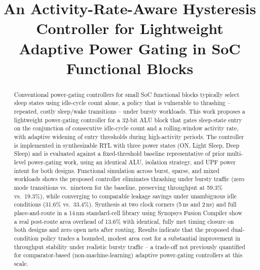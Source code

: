\documentclass[journal]{IEEEtran}
\begin{document}
\title{An Activity-Rate-Aware Hysteresis Controller for Lightweight Adaptive Power Gating in SoC Functional Blocks}

\author{
}

\maketitle


\begin{abstract}
Conventional power-gating controllers for small SoC functional blocks typically select sleep states using idle-cycle count alone, a policy that is vulnerable to thrashing -- repeated, costly sleep/wake transitions -- under bursty workloads. This work proposes a lightweight power-gating controller for a 32-bit ALU block that gates sleep-state entry on the conjunction of consecutive idle-cycle count and a rolling-window activity rate, with adaptive widening of entry thresholds during high-activity periods. The controller is implemented in synthesizable RTL with three power states (ON, Light Sleep, Deep Sleep) and is evaluated against a fixed-threshold baseline representative of prior multi-level power-gating work, using an identical ALU, isolation strategy, and UPF power intent for both designs. Functional simulation across burst, sparse, and mixed workloads shows the proposed controller eliminates thrashing under bursty traffic (zero mode transitions vs.\ nineteen for the baseline, preserving throughput at 59.3\% vs.\ 19.3\%), while converging to comparable leakage savings under unambiguous idle conditions (31.6\% vs.\ 33.4\%). Synthesis at two clock corners (5\,ns and 2\,ns) and full place-and-route in a 14\,nm standard-cell library using Synopsys Fusion Compiler show a real post-route area overhead of 13.6\% with identical, fully met timing closure on both designs and zero open nets after routing. Results indicate that the proposed dual-condition policy trades a bounded, modest area cost for a substantial improvement in throughput stability under realistic bursty traffic -- a trade-off not previously quantified for comparator-based (non-machine-learning) adaptive power-gating controllers at this scale.
\end{abstract}
\end{document}
